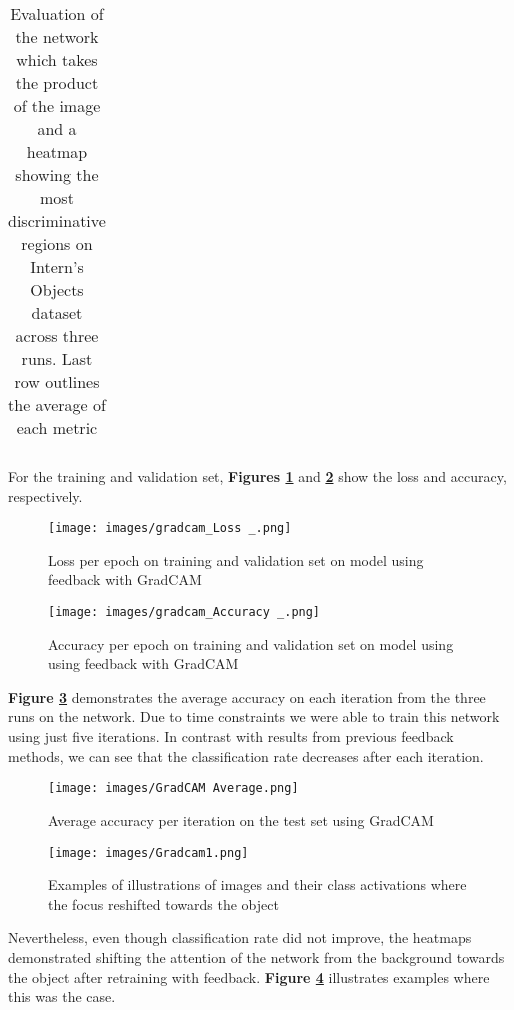 \documentclass{l4proj}
\begin{document}
\begin{table}[H]
\begin{tabular}{|l|l|l|l|l|l|l|l|}
\end{tabular}
\caption{Evaluation of the network which takes the product of the image and a heatmap showing the most discriminative regions on Intern's Objects dataset across three runs. Last row outlines the average of each metric}
\label{tab:gradcam}
\end{table}

For the training and validation set, \textbf{Figures \ref{fig:gradcamloss}} and \textbf{\ref{fig:gradcamaccuracy}} show the loss and accuracy, respectively.

\begin{figure}[H]
    \centering
\texttt{[image: images/gradcam\_Loss \_.png]}
    \caption{Loss per epoch on training and validation set on model using feedback with GradCAM}
    \label{fig:gradcamloss} 
\end{figure}

\begin{figure}[H]
    \centering
    \texttt{[image: images/gradcam\_Accuracy \_.png]}
    \caption{Accuracy per epoch on training and validation set on model using using feedback with GradCAM}
    \label{fig:gradcamaccuracy} 
\end{figure}

\textbf{Figure \ref{fig:gradcamav}} demonstrates the average accuracy on each iteration from the three runs on the network. Due to time constraints we were able to train this network using just five iterations. In contrast with results from previous feedback methods, we can see that the classification rate decreases after each iteration.

\begin{figure}[H]
    \centering
    \texttt{[image: images/GradCAM Average.png]}
    \caption{Average accuracy per iteration on the test set using GradCAM}
    \label{fig:gradcamav} 
\end{figure}

\begin{figure}[H]
    \centering
    \texttt{[image: images/Gradcam1.png]}
    \caption{Examples of illustrations of images and their class activations where the focus reshifted towards the object}
    \label{fig:gradcammask} 
\end{figure}

Nevertheless, even though classification rate did not improve, the heatmaps demonstrated shifting the attention of the network from the background towards the object after retraining with feedback.
\textbf{Figure \ref{fig:gradcammask}} illustrates examples where this was the case.
\end{document}
